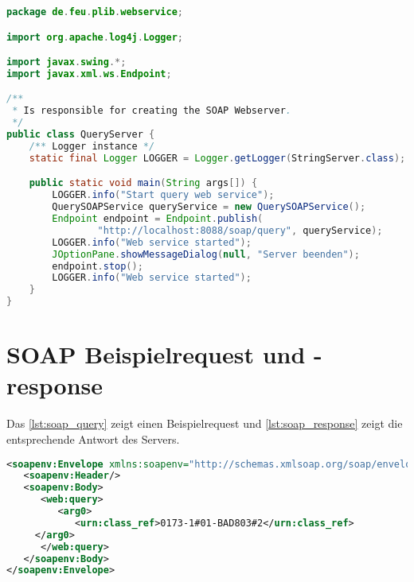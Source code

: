 \begin{lstlisting}[caption=SOAP Webservice Server, language=Java, label=lst:soap_webservice_server]
package de.feu.plib.webservice;

import org.apache.log4j.Logger;

import javax.swing.*;
import javax.xml.ws.Endpoint;

/**
 * Is responsible for creating the SOAP Webserver.
 */
public class QueryServer {
    /** Logger instance */
    static final Logger LOGGER = Logger.getLogger(StringServer.class);

    public static void main(String args[]) {
        LOGGER.info("Start query web service");
        QuerySOAPService queryService = new QuerySOAPService();
        Endpoint endpoint = Endpoint.publish(
                "http://localhost:8088/soap/query", queryService);
        LOGGER.info("Web service started");
        JOptionPane.showMessageDialog(null, "Server beenden");
        endpoint.stop();
        LOGGER.info("Web service started");
    }
}
 \end{lstlisting}   

\section{SOAP Beispielrequest und -response}

Das \autoref{lst:soap_query} zeigt einen Beispielrequest und \autoref{lst:soap_response} zeigt die entsprechende Antwort des Servers. 

\begin{lstlisting}[caption=Beispielanfrage SOAP Webservice query, language=XML, label=lst:soap_query]
 <soapenv:Envelope xmlns:soapenv="http://schemas.xmlsoap.org/soap/envelope/" xmlns:web="http://webservice.plib.feu.de/" xmlns:urn="urn:iso:std:iso:ts:29002:-31:ed-1:tech:xml-schema:query" xmlns:urn1="urn:iso:std:iso:ts:29002:-10:ed-1:tech:xml-schema:catalogue" xmlns:urn2="urn:iso:std:iso:ts:29002:-4:ed-1:tech:xml-schema:basic" xmlns:urn3="urn:iso:std:iso:ts:29002:-10:ed-1:tech:xml-schema:value">
   <soapenv:Header/>
   <soapenv:Body>
      <web:query>
         <arg0>
            <urn:class_ref>0173-1#01-BAD803#2</urn:class_ref>
	 </arg0>
      </web:query>
   </soapenv:Body>
</soapenv:Envelope>    
 \end{lstlisting}  


